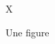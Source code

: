 \documentclass{article}
\begin{document}
\begin{figure}[ht]
\centering X
\caption{Une figure}
\end{figure}
\end{document}
